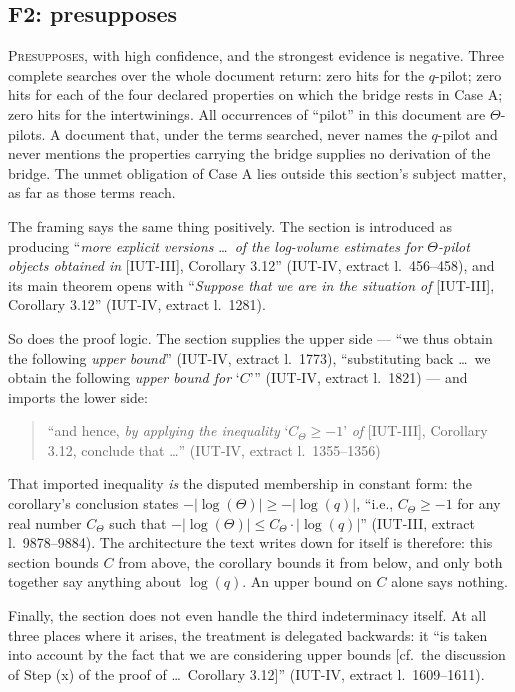 \documentclass[11pt,a4paper]{article}
\theoremstyle{definition}
\newcommand{\anchor}[2]{(#1, extract l.~#2)}
\begin{document}
\subsection{F2: presupposes}

\textsc{Presupposes}, with high confidence, and the strongest evidence is
negative. Three complete searches over the whole document return: zero hits for
the $q$-pilot; zero hits for each of the four declared properties on which the
bridge rests in Case A; zero hits for the intertwinings. All occurrences of
``pilot'' in this document are $\Theta$-pilots. A document that, under the terms
searched, never names the $q$-pilot and never mentions the properties carrying the
bridge supplies no derivation of the bridge. The unmet obligation of Case A lies
outside this section's subject matter, as far as those terms reach.

The framing says the same thing positively. The section is introduced as producing
``\emph{more explicit versions} \dots\ \emph{of the log-volume estimates for
$\Theta$-pilot objects obtained in} [IUT-III], Corollary 3.12''
\anchor{IUT-IV}{456--458}, and its main theorem opens with ``\emph{Suppose that we
are in the situation of} [IUT-III], Corollary 3.12''
\anchor{IUT-IV}{1281}.

So does the proof logic. The section supplies the upper side --- ``we thus obtain
the following \emph{upper bound}'' \anchor{IUT-IV}{1773}, ``substituting back
\dots\ we obtain the following \emph{upper bound for} `$C$'''
\anchor{IUT-IV}{1821} --- and imports the lower side:

\begin{quote}\small
``and hence, \emph{by applying the inequality} `$C_\Theta \ge -1$' \emph{of} [IUT-III],
Corollary 3.12, conclude that \dots'' \hfill\anchor{IUT-IV}{1355--1356}
\end{quote}

That imported inequality \emph{is} the disputed membership in constant form: the
corollary's conclusion states $-|\log(\Theta)| \ge -|\log(q)|$, ``i.e., $C_\Theta \ge -1$
for any real number $C_\Theta$ such that
$-|\log(\Theta)| \le C_\Theta \cdot |\log(q)|$''
\anchor{IUT-III}{9878--9884}. The architecture the text writes down for itself is
therefore: this section bounds $C$ from above, the corollary bounds it from below,
and only both together say anything about $\log(q)$. An upper bound on $C$ alone
says nothing.

Finally, the section does not even handle the third indeterminacy itself. At all
three places where it arises, the treatment is delegated backwards: it ``is taken
into account by the fact that we are considering upper bounds [cf.\ the discussion
of Step (x) of the proof of \dots\ Corollary 3.12]'' \anchor{IUT-IV}{1609--1611}.
\end{document}
